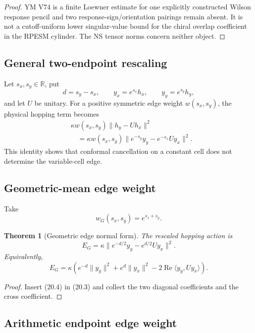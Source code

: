\documentclass[11pt]{article}
\newtheorem{theorem}{Theorem}[section]
\theoremstyle{remark}
\begin{document}
\begin{proof}
YM V74 is a finite Loewner estimate for one explicitly constructed
Wilson response pencil and two response-sign/orientation pairings
remain absent.  It is not a cutoff-uniform lower singular-value
bound for the chiral overlap coefficient in the RPESM cylinder.
The NS tensor norms concern neither object.
\end{proof}

\subsection{General two-endpoint rescaling}

Let \(s_x,s_y\in\mathbb R\), put
\[
 d=s_y-s_x,\qquad
 y_x=e^{s_x}h_x,\qquad y_y=e^{s_y}h_y,             \tag{20.2}
\]
and let \(U\) be unitary.  For a positive symmetric edge weight
\(w(s_x,s_y)\), the physical hopping term becomes
\[
\begin{aligned}
 &\kappa w(s_x,s_y)\|h_y-Uh_x\|^2\\
 &\quad=
 \kappa w(s_x,s_y)
 \|e^{-s_y}y_y-e^{-s_x}Uy_x\|^2.                  \tag{20.3}
\end{aligned}
\]
This identity shows that conformal cancellation on a constant
cell does not determine the variable-cell edge.

\subsection{Geometric-mean edge weight}

Take
\[
 w_G(s_x,s_y)=e^{s_x+s_y}.                         \tag{20.4}
\]

\begin{theorem}[Geometric edge normal form]
\label{thm:v17v20-geometric}
The rescaled hopping action is
\[
\boxed{
 E_G
 =\kappa
 \|e^{-d/2}y_y-e^{d/2}Uy_x\|^2.}                  \tag{20.5}
\]
Equivalently,
\[
 E_G=\kappa\left(
 e^{-d}\|y_y\|^2+e^d\|y_x\|^2
 -2\operatorname{Re}\langle y_y,Uy_x\rangle
 \right).                                         \tag{20.6}
\]
\end{theorem}

\begin{proof}
Insert (20.4) in (20.3) and collect the two diagonal coefficients
and the cross coefficient.
\end{proof}

\subsection{Arithmetic endpoint edge weight}
\end{document}
